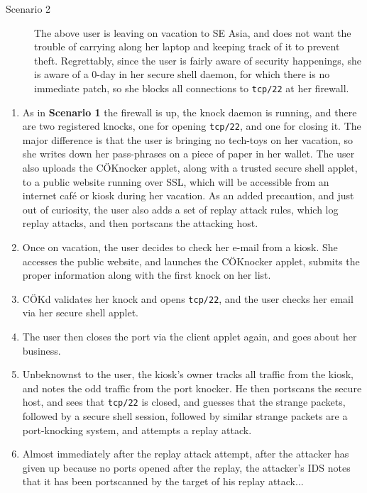 \documentclass[landscape,twocolumn,headrule]{foils}
\begin{document}

\begin{description}
\item[Scenario 2] The above user is leaving on vacation to SE Asia, and does not want the trouble of carrying along her laptop and keeping track of it to prevent theft.  Regrettably, since the user is fairly aware of security happenings, she is aware of a 0-day in her secure shell daemon, for which there is no immediate patch, so she blocks all connections to \texttt{tcp/22}  at her firewall.
\end{description}

\begin{enumerate}
\item As in \textbf{Scenario 1} the firewall is up, the knock daemon is running, and there are two registered knocks, one for opening \texttt{tcp/22}, and one for closing it.  The major difference is that the user is bringing no tech-toys on her vacation, so she writes down her pass-phrases on a piece of paper in her wallet.  The user also uploads the C\"{O}Knocker applet, along with a trusted secure shell applet, to a public website running over SSL, which will be accessible from an internet caf\'{e} or kiosk during her vacation.  As an added precaution, and just out of curiosity, the user also adds a set of replay attack rules, which log replay attacks, and then portscans the attacking host.


\item Once on vacation, the user decides to check her e-mail from a kiosk.  She accesses the public website, and launches the C\"{O}Knocker applet, submits the proper information along with the first knock on her list.
\item C\"{O}Kd validates her knock and opens \texttt{tcp/22}, and the user checks her email via her secure shell applet.
\item The user then closes the port via the client applet again, and goes about her business.
\item Unbeknownst to the user, the kiosk's owner tracks all traffic from the kiosk, and notes the odd traffic from the port knocker.  He then portscans the secure host, and sees that \texttt{tcp/22} is closed, and guesses that the strange packets, followed by a secure shell session, followed by similar strange packets are a port-knocking system, and attempts a replay attack.
\item Almost immediately after the replay attack attempt, after the attacker has given up because no ports opened after the replay, the attacker's IDS notes that it has been portscanned by the target of his replay attack...
\end{enumerate}
\end{document}
